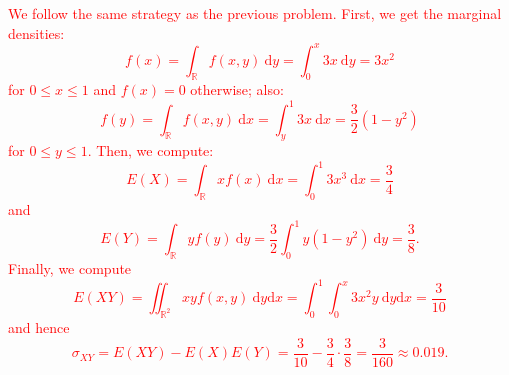 \documentclass[12pt,reqno]{amsart}
\begin{document}
\bigskip
\textcolor{red}{We follow the same strategy as the previous problem. First, we get the marginal densities:
	\[f(x) = \int_{\mathbb{R}} f(x,y) \ \text{d}y = \int_0^x 3x \ \text{d}y = 3x^2
	\]
for $0\leq x \leq 1$ and $f(x)=0$ otherwise; also:
	\[f(y) = \int_{\mathbb{R}} f(x,y) \ \text{d} x = \int_y^1 3x \ \text{d}x = \frac{3}{2}(1-y^2)
	\]
for $0\leq y \leq 1$. Then, we compute:
	\[E(X) = \int_{\mathbb{R}} x f(x) \ \text{d}x = \int_0^1 3x^3 \ \text{d}x = \frac{3}{4}
	\]
and
	\[E(Y) = \int_{\mathbb{R}} y f(y) \ \text{d}y = \frac{3}{2} \int_0^1 y (1-y^2) \ \text{d}y = \frac{3}{8}.
	\]
Finally, we compute
	\[E(XY) = \iint_{\mathbb{R}^2} xy f(x,y) \ \text{d}y\text{d}x = \int_0^1 \int_0^x 3x^2y \ \text{d}y\text{d}x = \frac{3}{10}
	\]
and hence
	\[\sigma_{XY} = E(XY) - E(X) E(Y) = \frac{3}{10} - \frac{3}{4} \cdot \frac{3}{8} = \frac{3}{160} \approx 0.019.
	\]}
	
\end{document}
